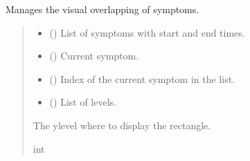 \documentclass[letterpaper,10pt,english]{sphinxmanual}
\begin{document}
\begin{fulllineitems}
\label{\detokenize{frise:frise.fonctions_frise.chevauchement}}
\pysigstartsignatures
{}
\pysigstopsignatures
\sphinxAtStartPar
Manages the visual overlapping of symptoms.
\begin{quote}\begin{description}
\begin{itemize}
\item {} 
\sphinxAtStartPar
{} () \textendash{} List of symptoms with start and end times.

\item {} 
\sphinxAtStartPar
{} () \textendash{} Current symptom.

\item {} 
\sphinxAtStartPar
{} () \textendash{} Index of the current symptom in the list.

\item {} 
\sphinxAtStartPar
{} () \textendash{} List of levels.

\end{itemize}

\sphinxAtStartPar
The y\sphinxhyphen{}level where to display the rectangle.

\sphinxAtStartPar
int

\end{description}\end{quote}

\end{fulllineitems}

\end{document}
